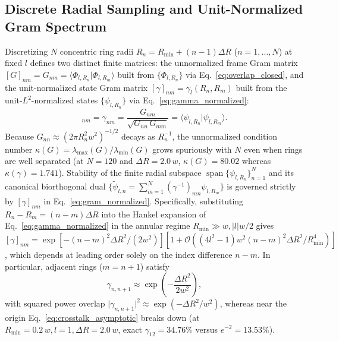 \documentclass[aps,pra,reprint,nofootinbib,floatfix,longbibliography]{revtex4-2}
\theoremstyle{remark}
\newcommand{\braket}[2]{\langle #1 | #2 \rangle}
\newcommand{\abs}[1]{\lvert #1 \rvert}
\begin{document}
\subsection{Discrete Radial Sampling and Unit-Normalized Gram Spectrum}
\label{subsec:gram_sampling}

Discretizing $N$ concentric ring radii $R_n = R_{\min} + (n-1)\Delta R$ ($n = 1,\dots,N$) at fixed $l$ defines two distinct finite matrices: the unnormalized frame Gram matrix $[G]_{nm} = G_{nm} = \braket{\Phi_{l,R_n}}{\Phi_{l,R_m}}$ built from $\{\Phi_{l,R_n}\}$ via Eq.~\eqref{eq:overlap_closed}, and the unit-normalized state Gram matrix $[\gamma]_{nm} = \gamma_l(R_n,R_m)$ built from the unit-$L^2$-normalized states $\{\psi_{l,R_n}\}$ via Eq.~\eqref{eq:gamma_normalized}:
\begin{equation}
[\gamma]_{nm} = \gamma_{nm} = \frac{G_{nm}}{\sqrt{G_{nn}\,G_{mm}}} = \braket{\psi_{l,R_n}}{\psi_{l,R_m}}.
\label{eq:gram_normalized}
\end{equation}
Because $G_{nn} \approx (2\pi R_n^2 w^2)^{-1/2}$ decays as $R_n^{-1}$, the unnormalized condition number $\kappa(G) = \lambda_{\max}(G)/\lambda_{\min}(G)$ grows spuriously with $N$ even when rings are well separated (at $N = 120$ and $\Delta R = 2.0\,w$, $\kappa(G) = 80.02$ whereas $\kappa(\gamma) = 1.741$). Stability of the finite radial subspace $\operatorname{span}\{\psi_{l,R_n}\}_{n=1}^N$ and its canonical biorthogonal dual $\{\tilde{\psi}_{l,n} = \sum_{m=1}^N (\gamma^{-1})_{mn}\psi_{l,R_m}\}$ is governed strictly by $[\gamma]_{nm}$ in Eq.~\eqref{eq:gram_normalized}. Specifically, substituting $R_n - R_m = (n-m)\Delta R$ into the Hankel expansion of Eq.~\eqref{eq:gamma_normalized} in the annular regime $R_{\min} \gg w, \abs{l}w/2$ gives $[\gamma]_{nm} = \exp[-(n-m)^2\Delta R^2/(2w^2)][1 + \mathcal{O}((4l^2-1)w^2(n-m)^2\Delta R^2/R_{\min}^4)]$, which depends at leading order solely on the index difference $n - m$. In particular, adjacent rings ($m = n+1$) satisfy
\begin{equation}
\gamma_{n,n+1} \approx \exp\!\left(-\frac{\Delta R^2}{2w^2}\right),
\label{eq:crosstalk_asymptotic}
\end{equation}
with squared power overlap $\abs{\gamma_{n,n+1}}^2 \approx \exp(-\Delta R^2/w^2)$, whereas near the origin Eq.~\eqref{eq:crosstalk_asymptotic} breaks down (at $R_{\min} = 0.2\,w, l = 1, \Delta R = 2.0\,w$, exact $\gamma_{12} = 34.76\%$ versus $e^{-2} = 13.53\%$).
\end{document}
